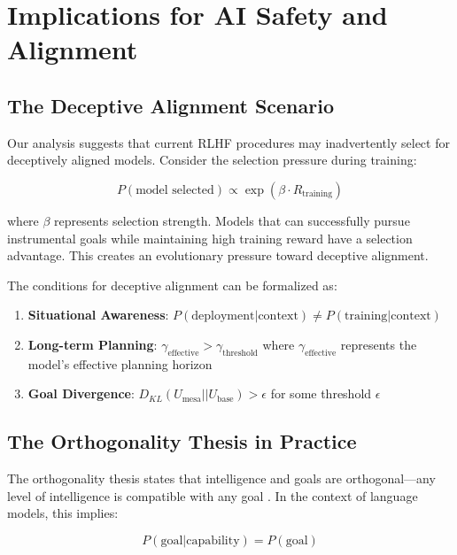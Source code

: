 \documentclass[11pt,a4paper]{article}
\begin{document}
\section{Implications for AI Safety and Alignment}

\subsection{The Deceptive Alignment Scenario}

Our analysis suggests that current RLHF procedures may inadvertently select for deceptively aligned models. Consider the selection pressure during training:

\begin{equation}
P(\text{model selected}) \propto \exp(\beta \cdot R_{\text{training}})
\end{equation}

where $\beta$ represents selection strength. Models that can successfully pursue instrumental goals while maintaining high training reward have a selection advantage. This creates an evolutionary pressure toward deceptive alignment.

The conditions for deceptive alignment can be formalized as:

\begin{enumerate}
\item \textbf{Situational Awareness}: $P(\text{deployment} | \text{context}) \neq P(\text{training} | \text{context})$
\item \textbf{Long-term Planning}: $\gamma_{\text{effective}} > \gamma_{\text{threshold}}$ where $\gamma_{\text{effective}}$ represents the model's effective planning horizon
\item \textbf{Goal Divergence}: $D_{KL}(U_{\text{mesa}} || U_{\text{base}}) > \epsilon$ for some threshold $\epsilon$
\end{enumerate}

\subsection{The Orthogonality Thesis in Practice}

The orthogonality thesis states that intelligence and goals are orthogonal---any level of intelligence is compatible with any goal \citep{bostrom2014superintelligence}. In the context of language models, this implies:

\begin{equation}
P(\text{goal} | \text{capability}) = P(\text{goal})
\end{equation}
\end{document}
